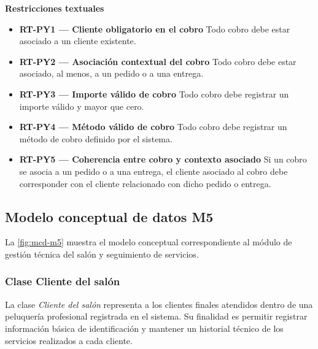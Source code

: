 \textbf{Restricciones textuales}

\begin{itemize}
      \item \textbf{RT-PY1 — Cliente obligatorio en el cobro}
            Todo cobro debe estar asociado a un cliente existente.
      \item \textbf{RT-PY2 — Asociación contextual del cobro}
            Todo cobro debe estar asociado, al menos, a un pedido o a una entrega.
      \item \textbf{RT-PY3 — Importe válido de cobro}
            Todo cobro debe registrar un importe válido y mayor que cero.
      \item \textbf{RT-PY4 — Método válido de cobro}
            Todo cobro debe registrar un método de cobro definido por el sistema.
      \item \textbf{RT-PY5 — Coherencia entre cobro y contexto asociado}
            Si un cobro se asocia a un pedido o a una entrega, el cliente asociado al cobro debe corresponder con el cliente relacionado con dicho pedido o entrega.
\end{itemize}

\subsection{Modelo conceptual de datos M5}

La \autoref{fig:mcd-m5} muestra el modelo conceptual correspondiente al módulo de gestión técnica del salón y seguimiento de servicios.


\subsubsection{Clase Cliente del salón}

La clase \textit{Cliente del salón} representa a los clientes finales atendidos dentro de una peluquería profesional registrada en el sistema. Su finalidad es permitir registrar información básica de identificación y mantener un historial técnico de los servicios realizados a cada cliente.

